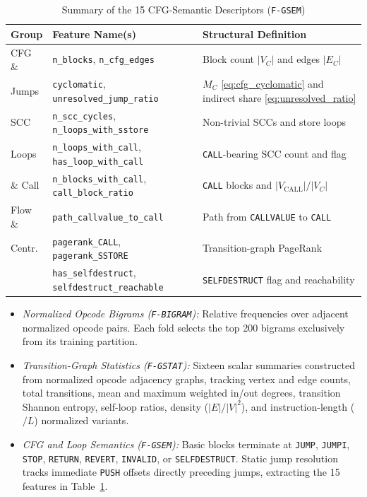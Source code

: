 \documentclass[conference]{IEEEtran}
\begin{document}
\begin{table}[t]
\centering
\caption{Summary of the 15 CFG-Semantic Descriptors (\texttt{F-GSEM})}
\label{tab:gsem_features}
\scriptsize
\setlength{\tabcolsep}{2.5pt}
\begin{tabular}{@{}l>{\raggedright\arraybackslash}p{3.45cm}>{\raggedright\arraybackslash}p{3.45cm}@{}}
\toprule
Group & Feature Name(s) & Structural Definition \\
\midrule
CFG \& & \texttt{n\_blocks}, \texttt{n\_cfg\_edges} & Block count $|V_C|$ and edges $|E_C|$ \\
Jumps & \texttt{cyclomatic}, \texttt{unresolved\_jump\_ratio} & $M_C$ \eqref{eq:cfg_cyclomatic} and indirect share \eqref{eq:unresolved_ratio} \\
\midrule
SCC & \texttt{n\_scc\_cycles}, \texttt{n\_loops\_with\_sstore} & Non-trivial SCCs and store loops \\
Loops & \texttt{n\_loops\_with\_call}, \texttt{has\_loop\_with\_call} & \texttt{CALL}-bearing SCC count and flag \\
 \& Call & \texttt{n\_blocks\_with\_call}, \texttt{call\_block\_ratio} & \texttt{CALL} blocks and $|V_{\text{CALL}}|/|V_C|$ \\
\midrule
Flow \& & \texttt{path\_callvalue\_to\_call} & Path from \texttt{CALLVALUE} to \texttt{CALL} \\
Centr. & \texttt{pagerank\_CALL}, \texttt{pagerank\_SSTORE} & Transition-graph PageRank \\
 & \texttt{has\_selfdestruct}, \texttt{selfdestruct\_reachable} & \texttt{SELFDESTRUCT} flag and reachability \\
\bottomrule
\end{tabular}
\end{table}

\begin{itemize}
\item \emph{Normalized Opcode Bigrams (\texttt{F-BIGRAM}):} Relative frequencies over adjacent normalized opcode pairs. Each fold selects the top 200 bigrams exclusively from its training partition.
\item \emph{Transition-Graph Statistics (\texttt{F-GSTAT}):} Sixteen scalar summaries constructed from normalized opcode adjacency graphs, tracking vertex and edge counts, total transitions, mean and maximum weighted in/out degrees, transition Shannon entropy, self-loop ratios, density ($|E|/|V|^2$), and instruction-length ($/L$) normalized variants.
\item \emph{CFG and Loop Semantics (\texttt{F-GSEM}):} Basic blocks terminate at \texttt{JUMP}, \texttt{JUMPI}, \texttt{STOP}, \texttt{RETURN}, \texttt{REVERT}, \texttt{INVALID}, or \texttt{SELFDESTRUCT}. Static jump resolution tracks immediate \texttt{PUSH} offsets directly preceding jumps, extracting the 15 features in Table~\ref{tab:gsem_features}.
\end{itemize}
\end{document}
